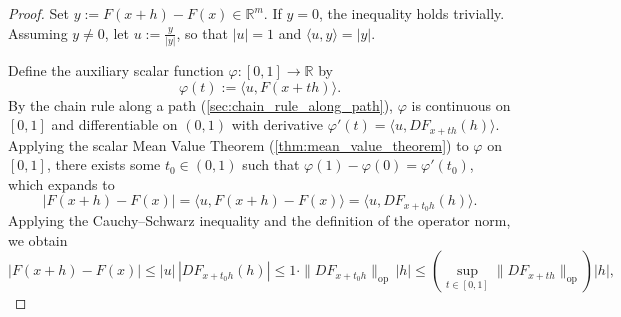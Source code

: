 \begin{proof}
Set $y := F(x+h) - F(x) \in \mathbb{R}^m$. If $y = 0$, the inequality holds trivially. Assuming $y \neq 0$, let $u := \frac{y}{|y|}$, so that $|u| = 1$ and $\langle u, y \rangle = |y|$.

Define the auxiliary scalar function $\varphi : [0,1] \to \mathbb{R}$ by
\[
\varphi(t) := \langle u, F(x+th) \rangle.
\]
By the chain rule along a path (\cref{sec:chain_rule_along_path}), $\varphi$ is continuous on $[0,1]$ and differentiable on $(0,1)$ with derivative $\varphi'(t) = \langle u, DF_{x+th}(h) \rangle$. Applying the scalar Mean Value Theorem (\cref{thm:mean_value_theorem}) to $\varphi$ on $[0,1]$, there exists some $t_0 \in (0,1)$ such that $\varphi(1) - \varphi(0) = \varphi'(t_0)$, which expands to
\[
|F(x+h) - F(x)| = \langle u, F(x+h) - F(x) \rangle = \langle u, DF_{x+t_0 h}(h) \rangle.
\]
Applying the Cauchy--Schwarz inequality and the definition of the operator norm, we obtain
\[
|F(x+h) - F(x)| \leq |u| \, |DF_{x+t_0 h}(h)| \leq 1 \cdot \|DF_{x+t_0 h}\|_{\mathrm{op}} \, |h| \leq \left( \sup_{t \in [0,1]} \|DF_{x+th}\|_{\mathrm{op}} \right) |h|,
\]
\end{proof}

